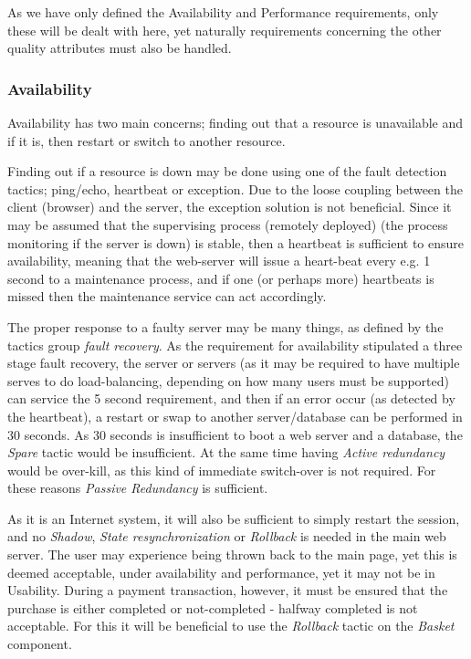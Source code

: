 As we have only defined the Availability and Performance requirements, only these will be dealt with here, yet naturally requirements concerning the other quality attributes must also be handled.

\subsubsection{Availability}
Availability has two main concerns; finding out that a resource is unavailable and if it is, then restart or switch to another resource. 

Finding out if a resource is down may be done using one of the fault detection tactics; ping/echo, heartbeat or exception. Due to the loose coupling between the client (browser) and the server, the exception solution is not beneficial. Since it may be assumed that the supervising process (remotely deployed) (the process monitoring if the server is down) is stable, then a heartbeat is sufficient to ensure availability, meaning that the web-server will issue a heart-beat every e.g. 1 second to a maintenance process, and if one (or perhaps more) heartbeats is missed then the maintenance service can act accordingly.

The proper response to a faulty server may be many things, as defined by the tactics group \emph{fault recovery}. As the requirement for availability stipulated a three stage fault recovery, the server or servers (as it may be required to have multiple serves to do load-balancing, depending on how many users must be supported) can service the 5 second requirement, and then if an error occur (as detected by the heartbeat), a restart or swap to another server/database can be performed in 30 seconds. As 30 seconds is insufficient to boot a web server and a database, the \emph{Spare} tactic would be insufficient. At the same time having \emph{Active redundancy} would be over-kill, as this kind of immediate switch-over is not required. For these reasons \emph{Passive Redundancy} is sufficient.

As it is an Internet system, it will also be sufficient to simply restart the session, and no \emph{Shadow}, \emph{State resynchronization} or \emph{Rollback} is needed in the main web server. The user may experience being thrown back to the main page, yet this is deemed acceptable, under availability and performance, yet it may not be in Usability. During a payment transaction, however, it must be ensured that the purchase is either completed or not-completed - halfway completed is not acceptable. For this it will be beneficial to use the \emph{Rollback} tactic on the \emph{Basket} component.

